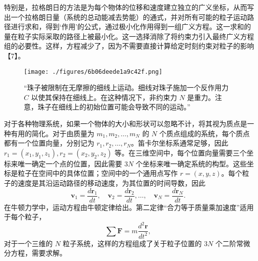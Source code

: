 特别是，拉格朗日的方法是为每个物体的位移和速度建立独立的广义坐标，从而写出一个拉格朗日量（系统的总动能减去势能）的通式，并对所有可能的粒子运动路径进行求和，得到‘作用’的公式，通过极小化作用得到一组广义方程。这一求和的量在粒子实际采取的路径上被最小化。这一选择消除了将约束力引入最终广义方程组的必要性。这样，方程减少了，因为不需要直接计算给定时刻约束对粒子的影响【7】。
\begin{figure}[ht]
\centering
\texttt{[image: ./figures/6b06deede1a9c42f.png]}
\caption{“珠子被限制在无摩擦的细线上运动。细线对珠子施加一个反作用力 \( C \) 以使其保持在细线上。在这种情况下，非约束力 \( N \) 是重力。注意，珠子在细线上的初始位置可能会导致不同的运动。”} \label{fig_LGL_2}
\end{figure}
对于各种物理系统，如果一个物体的大小和形状可以忽略不计，将其视为质点是一种有用的简化。对于由质量为 \( m_1, m_2, \dots, m_N \) 的 \( N \) 个质点组成的系统，每个质点都有一个位置向量，分别记为 \( r_1, r_2, \dots, r_N \)。笛卡尔坐标系通常足够，因此 \( r_1 = (x_1, y_1, z_1), r_2 = (x_2, y_2, z_2) \) 等。在三维空间中，每个位置向量需要三个坐标来唯一确定一个点的位置，因此需要 \( 3N \) 个坐标来唯一确定系统的构型。这些坐标是粒子在空间中的具体位置；空间中的一个通用点写作 \( r = (x, y, z) \)。每个粒子的速度是其沿运动路径的移动速度，为其位置的时间导数，因此
\[
\mathbf{v}_1 = \frac{d\mathbf{r}_1}{dt}, \quad \mathbf{v}_2 = \frac{d\mathbf{r}_2}{dt}, \dots, \quad \mathbf{v}_N = \frac{d\mathbf{r}_N}{dt}.~
\]
在牛顿力学中，运动方程由牛顿定律给出。第二定律“合力等于质量乘加速度”适用于每个粒子，
\[
\sum \mathbf{F} = m \frac{d^2 \mathbf{r}}{dt^2},~
\]
对于一个三维的 \( N \) 粒子系统，这样的方程组成了关于粒子位置的 \( 3N \) 个二阶常微分方程，需要求解。
